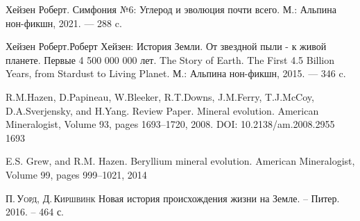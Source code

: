 \documentclass[a5paper,openany]{book}
\begin{document}
\begin{thebibliography}{99}
		
		



		
		
		 		Хейзен Роберт. Симфония №6: Углерод и эволюция почти всего. М.: Альпина нон-фикшн, 2021. — 288 c.
		
	 		Хейзен Роберт.Роберт Хейзен: История Земли. От звездной пыли - к живой планете. Первые 4 500 000 000 лет.		The Story of Earth. The First 4.5 Billion Years, from Stardust to Living Planet. 		 М.: Альпина нон-фикшн, 2015. — 346 c.	

		 		R.M.Hazen, D.Papineau, W.Bleeker, R.T.Downs, J.M.Ferry, T.J.McCoy, D.A.Sverjensky, and H.Yang. Review Paper. Mineral evolution. American Mineralogist, Volume 93, pages 1693–1720, 2008. DOI: 10.2138/am.2008.2955 1693

 E.S. Grew, and R.M. Hazen.
Beryllium mineral evolution. American
Mineralogist, Volume 99, pages 999–1021, 2014

		  		 \textsc{П.\,Уорд, Д.\,Киршвинк} Новая история происхождения жизни на Земле. -- Питер. 2016. --  464 с. 	
		 
	
		
		

\end{thebibliography}
\end{document}
